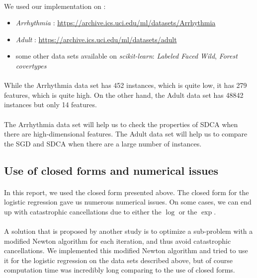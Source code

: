 \documentclass{article}
\begin{document}
\paragraph{}We used our implementation on :
\begin{itemize}
	\item \textit{Arrhythmia} : \url{https://archive.ics.uci.edu/ml/datasets/Arrhythmia}
	\item \textit{Adult} : \url{https://archive.ics.uci.edu/ml/datasets/adult}
	\item some other data sets available on \textit{scikit-learn}: \textit{Labeled Faced Wild}, \textit{Forest covertypes}
\end{itemize}

\paragraph{}While the Arrhythmia data set has 452 instances, which is quite low, it has 279 features, which is quite high.
On the other hand, the Adult data set has 48842 instances but only 14 features.

\paragraph{}The Arrhythmia data set will help us to check the properties of SDCA when there are high-dimensional features.
The Adult data set will help us to compare the SGD and SDCA when there are a large number of instances.

\subsection{Use of closed forms and numerical issues}

\paragraph{}In this report, we used the closed form presented above.
The closed form for the logistic regression gave us numerous numerical issues.
On some cases, we can end up with catastrophic cancellations due to either the $\log$ or the $\exp$.

\paragraph{}A solution that is proposed by another study is to optimize a sub-problem with a modified Newton algorithm for each iteration, and thus avoid catastrophic cancellations. We implemented this modified Newton algorithm and tried to use it for the logistic regression on the data sets described above, but of course computation time was incredibly long comparing to the use of closed forms.
\end{document}
